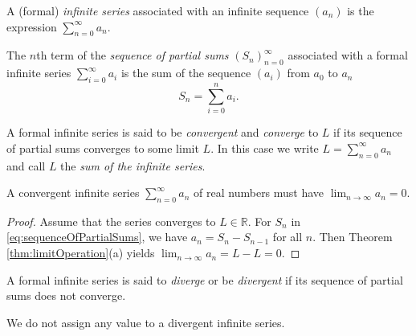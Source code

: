 \begin{defn}%
  \label{def:seriesFromSequence}
  A (formal) \emph{infinite series} associated with an infinite sequence $(a_n)$
   is the expression $\sum_{n=0}^{\infty} a_n$.
\end{defn}

\begin{defn}
  \label{def:sequenceOfPartialSums}
  The $n$th term of the \emph{sequence of partial sums}
  $(S_n)_{n=0}^{\infty}$ associated with a formal infinite series
  $\sum_{i=0}^{\infty} a_i$
  is the sum of the sequence $(a_i)$ from $a_0$ to $a_n$
  \begin{equation}
    \label{eq:sequenceOfPartialSums}
    S_n = \sum_{i=0}^{n} a_i.
  \end{equation}
\end{defn}

\begin{defn}
  A formal infinite series is said to be \emph{convergent}
  and \emph{converge} to $L$
  if its sequence of partial sums converges to some limit $L$.
  In this case we write $L=\sum_{n=0}^{\infty} a_n$
  and call $L$ the \emph{sum of the infinite series}.
\end{defn}

\begin{lem}
  \label{lem:seriesConvergeNecessity}
  A convergent infinite series $\sum_{n=0}^{\infty}a_{n}$ of real numbers
  must have $\lim_{n\rightarrow \infty}a_{n}=0$.
\end{lem}
\begin{proof}
  Assume that the series converges to $L\in \mathbb{R}$.
  For $S_{n}$ in \eqref{eq:sequenceOfPartialSums}, 
  we have $a_{n}=S_{n}-S_{n-1}$ for all $n$. 
  Then Theorem \ref{thm:limitOperation}(a) yields
  $\lim_{n\rightarrow \infty}a_{n}=L-L=0$.
\end{proof}

\begin{defn}
  A formal infinite series is said to \emph{diverge}
  or be \emph{divergent}
  if its sequence of partial sums does not converge.
\end{defn}

\begin{rem}
  We do not assign any value to a divergent infinite series.
\end{rem}


